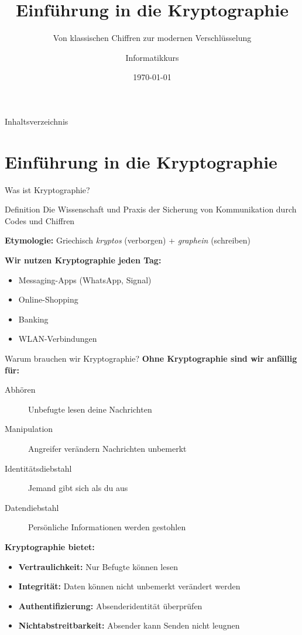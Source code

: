 \documentclass[handout]{beamer}
\title{Einführung in die Kryptographie}
\subtitle{Von klassischen Chiffren zur modernen Verschlüsselung}
\author{Informatikkurs}
\date{\today}
\begin{document}
\frame{\titlepage}

\begin{frame}{Inhaltsverzeichnis}
\tableofcontents
\end{frame}

\section{Einführung in die Kryptographie}

\begin{frame}{Was ist Kryptographie?}
\begin{block}{Definition}
Die Wissenschaft und Praxis der Sicherung von Kommunikation durch Codes und Chiffren
\end{block}

\textbf{Etymologie:} Griechisch \emph{kryptos} (verborgen) + \emph{graphein} (schreiben) \pause

\vspace{0.5cm}
\textbf{Wir nutzen Kryptographie jeden Tag:}
\begin{itemize}
    \item<2-> Messaging-Apps (WhatsApp, Signal)
    \item<3-> Online-Shopping
    \item<4-> Banking
    \item<5-> WLAN-Verbindungen
\end{itemize}

\end{frame}

\begin{frame}{Warum brauchen wir Kryptographie?}
\textbf{Ohne Kryptographie sind wir anfällig für:}

\begin{description}
    \item[Abhören] Unbefugte lesen deine Nachrichten
    \item[Manipulation] Angreifer verändern Nachrichten unbemerkt
    \item[Identitätsdiebstahl] Jemand gibt sich als du aus
    \item[Datendiebstahl] Persönliche Informationen werden gestohlen\pause
\end{description}


\vspace{0.5cm}
\textbf{Kryptographie bietet:}
\begin{itemize}
    \item \textbf{Vertraulichkeit:} Nur Befugte können lesen
    \item \textbf{Integrität:} Daten können nicht unbemerkt verändert werden
    \item \textbf{Authentifizierung:} Absenderidentität überprüfen
    \item \textbf{Nichtabstreitbarkeit:} Absender kann Senden nicht leugnen
\end{itemize}

\end{frame}
\end{document}
